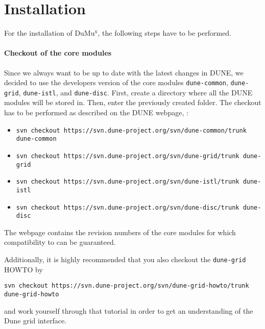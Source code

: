 \section{Installation} 

For the installation of DuMu$^\text{x}$, the following steps have to be performed.  

\paragraph{Checkout of the core modules}
Since we always want to be up to date with the latest changes in DUNE, 
we decided to use the developers version of the core modules 
\texttt{dune-common}, \texttt{dune-grid}, \texttt{dune-istl}, and \texttt{dune-disc}.  
First, create a directory where all the DUNE modules will be stored in. Then, enter the previously created folder. 
The checkout has to be performed as described on 
the DUNE webpage, \cite{DUNE-HP}: 
\begin{itemize}
\item \texttt{svn checkout https://svn.dune-project.org/svn/dune-common/trunk dune-common}
\item \texttt{svn checkout https://svn.dune-project.org/svn/dune-grid/trunk dune-grid}
\item \texttt{svn checkout https://svn.dune-project.org/svn/dune-istl/trunk dune-istl}
\item \texttt{svn checkout https://svn.dune-project.org/svn/dune-disc/trunk dune-disc}
\end{itemize} 
The \Dumux webpage \cite{dumux-hp} contains the revision numbers of the core modules 
for which compatibility to \Dumux can be guaranteed. 

Additionally, it is highly recommended that you also checkout the \texttt{dune-grid} HOWTO 
by 
\begin{center}
\texttt{svn checkout https://svn.dune-project.org/svn/dune-grid-howto/trunk dune-grid-howto}
\end{center}
and work yourself through that tutorial in order to get an understanding of 
the Dune grid interface. 

